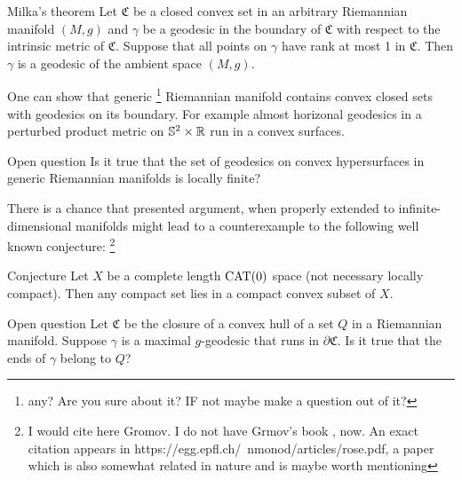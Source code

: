 \documentclass[a4paper,10pt]{article}
\begin{document}
\begin{thm}{Milka's theorem}
Let $\mathfrak{C}$ be a closed convex set in an arbitrary Riemannian manifold $(M,g)$ and $\gamma$ be a geodesic in the boundary of $\mathfrak{C}$ %
{\color{red} with respect to the intrinsic metric of $\mathfrak {C}$}.
Suppose that all points on $\gamma$ have rank at most 1 in $\mathfrak{C}$.
Then $\gamma$ is a geodesic of the ambient space $(M,g)$.
\end{thm}

One can show that generic  \footnote{any? Are you sure about it?  IF  not maybe make a question out of it?}  Riemannian manifold contains convex closed sets with geodesics on its boundary.
For example almost horizonal geodesics in a perturbed product metric on $\mathbb{S}^2\times\mathbb{R}$ run in a convex surfaces.

\begin{thm}{Open question}
Is it true that the set of geodesics on convex hypersurfaces in generic Riemannian manifolds is locally finite?
\end{thm}

There is a chance that presented argument{\color{red}, when properly extended to infinite-dimensional manifolds} might lead to a counterexample to the following well known conjecture: \footnote{I would cite here Gromov. I do not have Grmov's book ,
	now. An exact citation appears in
	 https://egg.epfl.ch/~nmonod/articles/rose.pdf, a paper which is also somewhat related in nature and is maybe worth mentioning}



\begin{thm}{Conjecture}
Let $X$ be a complete length $\operatorname{\rm CAT}(0)$ space (not necessary locally compact).
Then any compact set lies in a compact convex subset of $X$.
\end{thm}

\begin{thm}{Open question}
Let $\mathfrak{C}$ be the closure of a convex hull of a set $Q$ in a Riemannian manifold.
Suppose $\gamma$ is a maximal $g$-geodesic that runs in $\partial \mathfrak{C}$.
Is it true that the ends of $\gamma$ belong to $Q$?
\end{thm}




\end{document}
